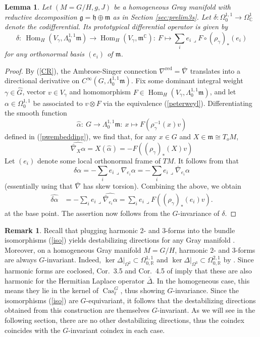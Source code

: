 \documentclass[12pt]{scrartcl}
\theoremstyle{plain}
\newtheorem{lem}[satz]{Lemma}
\theoremstyle{definition}
\newtheorem{bem}[satz]{Remark}
\newcommand{\R}{\mathbb{R}}%
\newcommand{\C}{\mathbb{C}}%
\newcommand{\Hom}{\operatorname{Hom}}%
\newcommand{\Cas}{\operatorname{Cas}}%
\newcommand{\m}{\mathfrak{m}}%
\newcommand{\h}{\mathfrak{h}}%
\newcommand{\g}{\mathfrak{g}}%
\newcommand{\CR}{\nabla^{\mathrm{red}}}%
\begin{document}
\begin{lem}\label{deltank6}
Let $(M=G/H,g,J)$ be a homogeneous Gray manifold with reductive decomposition $\g=\h\oplus\m$ as in Section \ref{sec:prelim3s}. Let $\delta: \Omega^{1,1}_0\to\Omega^1_\C$ denote the codifferential. Its prototypical differential operator is given by
\[\delta:\ \Hom_H(V_\gamma,\Lambda^{1,1}_0\m)\to\Hom_H(V_\gamma,\m^\C):\ F\mapsto\sum_ie_i\lrcorner F\circ(\rho_\gamma)_\ast(e_i)\]
for any orthonormal basis $(e_i)$ of $\m$.
\end{lem}
\begin{proof}
By (\ref{CR}), the Ambrose-Singer connection $\CR=\bar\nabla$ translates into a directional derivative on $C^\infty(G,\Lambda^{1,1}_0\m)$. Fix some dominant integral weight $\gamma\in\hat G$, vector $v\in V_\gamma$ and homomorphism $F\in\Hom_H(V_\gamma,\Lambda^{1,1}_0\m)$, and let $\alpha\in\Omega^{1,1}_0$ be associated to $v\otimes F$ via the equivalence (\ref{peterweyl}). Differentiating the smooth function
\[\hat\alpha:\ G\to\Lambda^{1,1}_0\m:\ x\mapsto F(\rho_\gamma^{-1}(x)v)\]
defined in (\ref{pwembedding}), we find that, for any $x\in G$ and $X\in\m\cong T_oM$,
\[\widehat{\bar\nabla_X\alpha}=X(\hat\alpha)=-F((\rho_\gamma)_\ast(X)v)\]
Let $(e_i)$ denote some local orthonormal frame of $TM$. It follows from \cite[Lem.~4.2]{nearlykaehler} that
\[\delta\alpha=-\sum_ie_i\lrcorner\nabla_{e_i}\alpha=-\sum_ie_i\lrcorner\bar\nabla_{e_i}\alpha\]
(essentially using that $\bar\nabla$ has skew torsion). Combining the above, we obtain
\begin{align*}
\widehat{\delta\alpha}&=-\sum_ie_i\lrcorner\widehat{\bar\nabla_{e_i}\alpha}=\sum_ie_i\lrcorner F((\rho_\gamma)_\ast(e_i)v).
\end{align*}
at the base point. The assertion now follows from the $G$-invariance of $\delta$.
\end{proof}

\begin{bem}\label{Ginv}
Recall that plugging harmonic $2$- and $3$-forms into the bundle isomorphisms (\ref{iso}) yields destabilizing directions for any Gray manifold \cite{nkstability}. Moreover, on a homogeneous Gray manifold $M=G/H$, harmonic $2$- and $3$-forms are always $G$-invariant. Indeed, $\ker\Delta\big|_{\Omega^2}\subset\Omega^{1,1}_{0,\R}$ and $\ker\Delta\big|_{\Omega^3}\subset\Omega^{2,1}_{0,\R}$ by \cite[Thm.~6.2]{verbitsky}. Since harmonic forms are coclosed, Cor.~3.5 and Cor.~4.5 of \cite{nearlykaehler} imply that these are also harmonic for the Hermitian Laplace operator $\bar\Delta$. In the homogeneous case, this means they lie in the kernel of $\Cas^G_\ell$, thus showing $G$-invariance. Since the isomorphisms (\ref{iso}) are $G$-equivariant, it follows that the destabilizing directions obtained from this construction are themselves $G$-invariant. As we will see in the following section, there are no other destabilizing directions, thus the coindex coincides with the $G$-invariant coindex in each case.
\end{bem}
\end{document}
